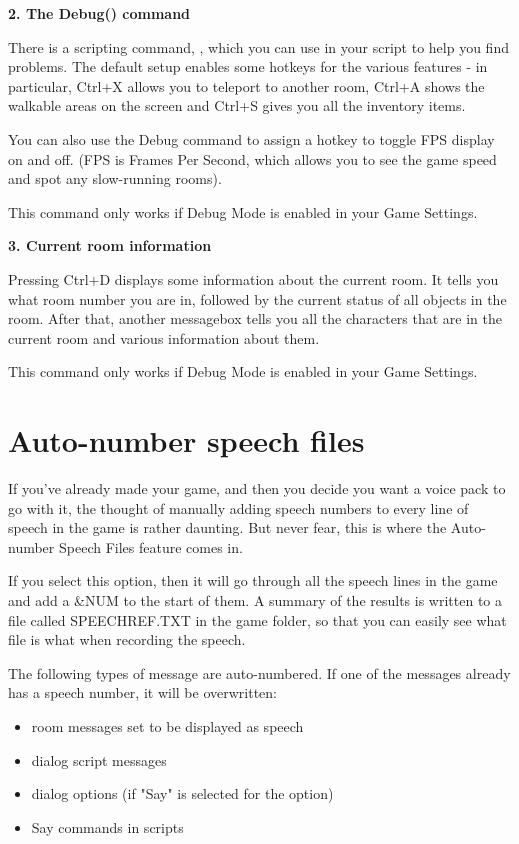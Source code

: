 \bf{2. The Debug() command}

There is a scripting command, , which you can use in your script
to help you find problems. The default setup enables some hotkeys for the various features -
in particular, Ctrl+X allows you to teleport to another room, Ctrl+A shows the walkable
areas on the screen and Ctrl+S gives you all the inventory items.

You can also use the Debug command to assign a hotkey to toggle FPS display on and off.
(FPS is Frames Per Second, which allows you to see the game speed and spot any slow-running
rooms).

This command only works if Debug Mode is enabled in your Game Settings.

\bf{3. Current room information}

Pressing Ctrl+D displays some information about the current room. It tells you what
room number you are in, followed by the current status of all objects in the room. After that,
another messagebox tells you all the characters that are in the current room and various
information about them.

This command only works if Debug Mode is enabled in your Game Settings.


\section{Auto-number speech files}%

If you've already made your game, and then you decide you want a voice pack to go with it,
the thought of manually adding speech numbers to every line of speech in the game is rather
daunting. But never fear, this is where the Auto-number Speech Files feature comes in.

If you select this option, then it will go through all the speech lines in the game and
add a &NUM to the start of them. A summary of the results is written to a file called
SPEECHREF.TXT in the game folder, so that you can easily see what file is what when
recording the speech.

The following types of message are auto-numbered. If one of the messages already has a speech
number, it will be overwritten:
\begin{itemize}
\item room messages set to be displayed as speech
\item dialog script messages
\item dialog options (if "Say" is selected for the option)
\item Say commands in scripts
\end{itemize}


